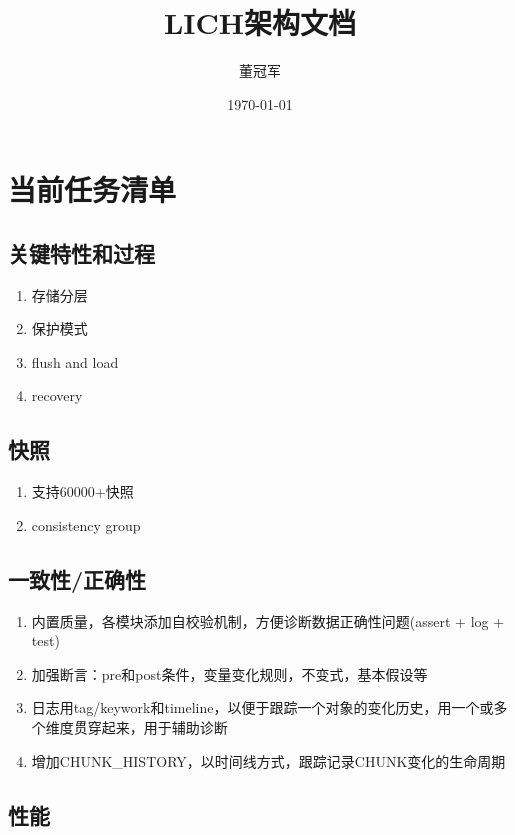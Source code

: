 \documentclass[UTF8]{ctexart}
\title{LICH架构文档}
\author{董冠军}
\date{\today}
\begin{document}
\maketitle
\tableofcontents

\section{当前任务清单}

\subsection{关键特性和过程}

\begin{enumerate}
    \item 存储分层
    \item 保护模式
    \item flush and load
    \item recovery
\end{enumerate}

\subsection{快照}

\begin{enumerate}
    \item 支持60000+快照
    \item consistency group
\end{enumerate}

\subsection{一致性/正确性}

\begin{enumerate}
    \item 内置质量，各模块添加自校验机制，方便诊断数据正确性问题(assert + log + test)
    \item 加强断言：pre和post条件，变量变化规则，不变式，基本假设等
    \item 日志用tag/keywork和timeline，以便于跟踪一个对象的变化历史，用一个或多个维度贯穿起来，用于辅助诊断
    \item 增加CHUNK\_HISTORY，以时间线方式，跟踪记录CHUNK变化的生命周期
\end{enumerate}

\subsection{性能}
\end{document}
